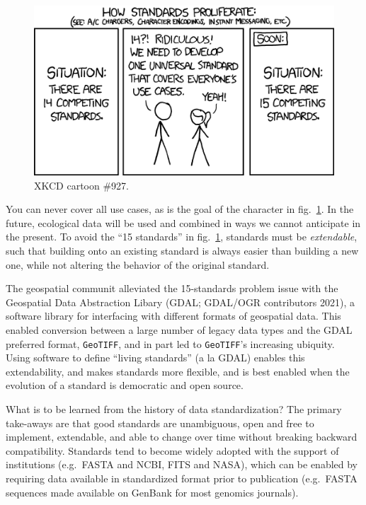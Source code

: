 \documentclass[11pt]{article}
\makeatletter
\def\maxwidth{\ifdim\Gin@nat@width>\linewidth\linewidth
\else\Gin@nat@width\fi}
\let\Oldincludegraphics\includegraphics
\renewcommand{\includegraphics}[1]{\Oldincludegraphics[width=\maxwidth]{#1}}
\makeatother
\begin{document}
\begin{figure}
\hypertarget{fig:xkcd}{%
\centering
\includegraphics{./figures/xkcdstandards.png}
\caption{XKCD cartoon \#927.}\label{fig:xkcd}
}
\end{figure}

You can never cover all use cases, as is the goal of the character in
fig.~\ref{fig:xkcd}. In the future, ecological data will be used and
combined in ways we cannot anticipate in the present. To avoid the ``15
standards'' in fig.~\ref{fig:xkcd}, standards must be \emph{extendable},
such that building onto an existing standard is always easier than
building a new one, while not altering the behavior of the original
standard.

The geospatial communit alleviated the 15-standards problem issue with
the Geospatial Data Abstraction Libary (GDAL; GDAL/OGR contributors
2021), a software library for interfacing with different formats of
geospatial data. This enabled conversion between a large number of
legacy data types and the GDAL preferred format, \texttt{GeoTIFF}, and
in part led to \texttt{GeoTIFF}'s increasing ubiquity. Using software to
define ``living standards'' (a la GDAL) enables this extendability, and
makes standards more flexible, and is best enabled when the evolution of
a standard is democratic and open source.

What is to be learned from the history of data standardization? The
primary take-aways are that good standards are unambiguous, open and
free to implement, extendable, and able to change over time without
breaking backward compatibility. Standards tend to become widely adopted
with the support of institutions (e.g.~FASTA and NCBI, FITS and NASA),
which can be enabled by requiring data available in standardized format
prior to publication (e.g.~FASTA sequences made available on GenBank for
most genomics journals).
\end{document}
